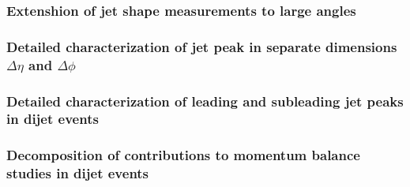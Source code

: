   \subsubsection{Extenshion of jet shape measurements to large angles}
  
  \subsubsection{Detailed characterization of jet peak in separate dimensions $\Delta\eta$ and $\Delta\phi$}
  
  \subsubsection{Detailed characterization of leading and subleading jet peaks in dijet events}
  
  \subsubsection{Decomposition of contributions to momentum balance studies in dijet events}
  \label{sec:motivation_decomp}
  
  